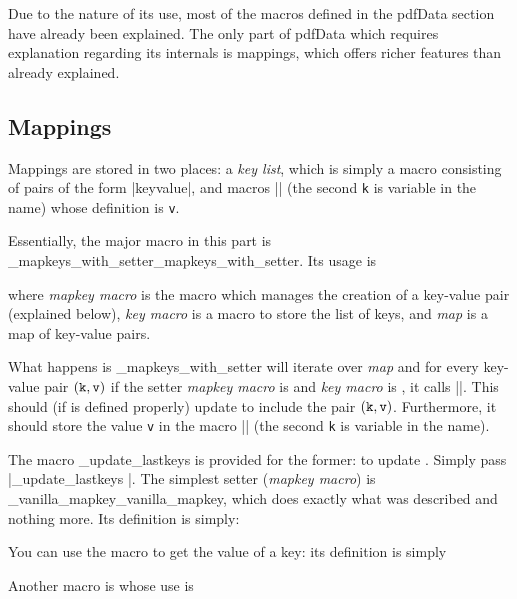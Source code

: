 Due to the nature of its use, most of the macros defined in the pdfData section have already been explained.
The only part of pdfData which requires explanation regarding its internals is mappings, which offers richer features than already explained.

\subsection{Mappings}

Mappings are stored in two places: a {\it key list}, which is simply a macro consisting of pairs of the form \inlinecode|{key}{value}|, and macros \inlinecode|\key@k| (the second {\tt k} is variable in the name) whose definition
is {\tt v}.

Essentially, the major macro in this part is \macro\_mapkeys_with_setter\anchormacro\_mapkeys_with_setter.
Its usage is

where {\it mapkey macro} is the macro which manages the creation of a key-value pair (explained below), {\it key macro} is a macro to store
the list of keys, and {\it map} is a map of key-value pairs.

What happens is \macro\_mapkeys_with_setter{} will iterate over {\it map} and for every key-value pair $({\tt k,v})$ if the setter {\it mapkey macro} is \macro\M{} and {\it key macro} is \macro\K{}, it calls
\inlinecode|\M {}|.
This should (if \macro\M{} is defined properly) update \macro\K{} to include the pair $({\tt k,v})$.
Furthermore, it should store the value {\tt v} in the macro \inlinecode|\key@k| (the second {\tt k} is variable in the name).

The macro \macro\_update_lastkeys{} is provided for the former: to update \macro\K{}.
Simply pass \inlinecode|\_update_lastkeys |.
The simplest setter ({\it mapkey macro}) is \macro\_vanilla_mapkey\anchormacro\_vanilla_mapkey, which does exactly what was described and nothing more.
Its definition is simply:

\blisting
\def\_vanilla_mapkey#1#2#3{%
    \_xp\def\csname key@\_id#2\endcsname{#3}%
    \_update_lastkeys{#1}{#2}{#3}%
}
\elisting

You can use the macro \macro\getvalue\anchormacro\getvalue{} to get the value of a key: its definition is simply

\blisting
\def\getvalue#1{%
    \csname key@#1\endcsname%
}
\elisting

Another macro is \macro\keyexists{} whose use is

